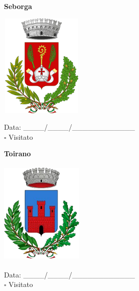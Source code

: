 \documentclass[a5paper,12pt]{article}
\begin{document}
\newpage

\noindent
\begin{minipage}[t]{0.45\textwidth}
    \begin{center}
        \textbf{Seborga}
    \end{center}
    \vspace{-0.5cm} %
    \begin{center}
        \includegraphics[height= 5cm, width=4cm]{Liguria/Stemma Seborga.png}
    \end{center}
    \vspace{-0.4cm} %
    \begin{flushleft}
        Data: \_\_\_\_/\_\_\_\_/\_\_\_\_\_\_\_\_\_\_\_\_ \\
        $\square$ Visitato
    \end{flushleft}
\end{minipage}
\hfill
\noindent
\begin{minipage}[t]{0.45\textwidth}
    \begin{center}
        \textbf{Toirano}
    \end{center}
    \vspace{-0.5cm} %
    \begin{center}
        \includegraphics[height= 5cm, width=4cm]{Liguria/Stemma Toirano.png}
    \end{center}
    \vspace{-0.4cm} %
    \begin{flushleft}
        Data: \_\_\_\_/\_\_\_\_/\_\_\_\_\_\_\_\_\_\_\_\_ \\
        $\square$ Visitato
    \end{flushleft}
\end{minipage}
\end{document}
